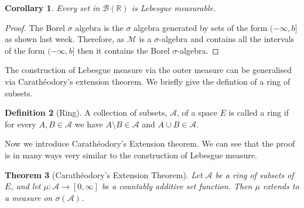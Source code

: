 \documentclass[11pt]{article}
\newtheorem{thm}{Theorem}[section]
\newtheorem{cor}[thm]{Corollary}
\theoremstyle{definition}
\newtheorem{dfn}[thm]{Definition}
\theoremstyle{remark}
\begin{document}
\begin{cor}
Every set in $\mathcal{B}(\mathbb{R})$ is Lebesgue measurable.
\end{cor}
\begin{proof}
The Borel $\sigma$ algebra is the $\sigma$ algebra generated by sets of the form $(-\infty, b]$ as shown last week. Therefore, as $\mathscr{M}$ is a $\sigma$-algebra and contains all the intervals of the form $(-\infty, b]$ then it contains the Borel $\sigma$-algebra.
\end{proof}





The construction of Lebesgue measure via the outer measure can be generalised via Carath\'eodory's extension theorem. We briefly give the defintion of a ring of subsets.
\begin{dfn}[Ring]
A collection of subsets, $\mathcal{A}$, of a space $E$ is called a ring if for every $A,B \in \mathcal{A}$ we have $A \setminus B \in \mathcal{A}$ and $A \cup B \in \mathcal{A}$.
\end{dfn}
Now we introduce Carath\'eodory's Extension theorem. We can see that the proof is in many ways very similar to the construction of Lebesgue measure. 
\begin{thm}[Carath\'eodory's Extension Theorem]
Let $\mathcal{A}$ be a ring of subsets of $E$, and let $\mu: \mathcal{A} \rightarrow [0, \infty]$ be a countably additive set function. Then $\mu$ extends to a measure on $\sigma(\mathcal{A})$.
\end{thm}
\end{document}
